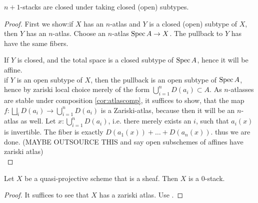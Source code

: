 \documentclass{article}
\begin{document}
\begin{lemma}
 $n+1$-stacks are closed under taking closed (open) subtypes.
\end{lemma}
\begin{proof}
First we show:if $X$ has an $n$-atlas and $Y$ is a closed (open) subtype of $X$, then $Y$ has an $n$-atlas. %
    Choose an $n$-atlas $\operatorname{Spec} A \to X$. The pullback to $Y$ has have the same fibers.
    
    If $Y$ is closed,  and the total space is a closed subtype of $\operatorname{Spec} A$, hence it will be affine. \\
    if $Y$ is an open subtype of $X$, then the pullback is an open subtype of $\operatorname{Spec} A$, hence by zariski local choice merely of the form $\bigcup_{i=1}^n D(a_i) \subset A$. 
    As $n$-atlasses are stable under composition \ref{cor:atlascomp}, it suffices to show, that the map $f : \bigsqcup_i D(a_i) \to \bigcup_{i=1}^n D(a_i)$ is a Zariski-atlas, because then it will be an $n$-atlas as well. Let $x : \bigcup_{i=1}^n D(a_i)$, i.e. there merely exists an $i$, such that $a_i(x)$ is invertible. The fiber is exactly $D(a_1(x)) + \hdots + D(a_n(x))$. thus we are done. (MAYBE OUTSOURCE THIS and say open subschemes of affines have zariski atlas)\\
    \end{proof}
\begin{corollary}
    Let $X$ be a quasi-projective scheme that is a sheaf. Then $X$ is a  0-stack. 
\end{corollary}   
\begin{proof}
    It suffices to see that $X$ has a zariski atlas. Use \label{ex:PnIsStack}.
\end{proof}
\end{document}
